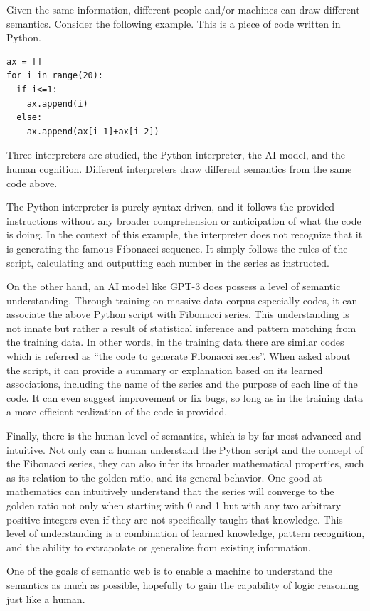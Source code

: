 Given the same information, different people and/or machines can draw different semantics. Consider the following example. This is a piece of code written in Python.
\begin{lstlisting}
ax = []
for i in range(20):
  if i<=1:
    ax.append(i)
  else:
    ax.append(ax[i-1]+ax[i-2])
\end{lstlisting}
Three interpreters are studied, the Python interpreter, the AI model, and the human cognition. Different interpreters draw different semantics from the same code above.

The Python interpreter is purely syntax-driven, and it follows the provided instructions without any broader comprehension or anticipation of what the code is doing. In the context of this example, the interpreter does not recognize that it is generating the famous Fibonacci sequence. It simply follows the rules of the script, calculating and outputting each number in the series as instructed.

On the other hand, an AI model like GPT-3 does possess a level of semantic understanding. Through training on massive data corpus especially codes, it can associate the above Python script with Fibonacci series. This understanding is not innate but rather a result of statistical inference and pattern matching from the training data. In other words, in the training data there are similar codes which is referred as ``the code to generate Fibonacci series''. When asked about the script, it can provide a summary or explanation based on its learned associations, including the name of the series and the purpose of each line of the code. It can even suggest improvement or fix bugs, so long as in the training data a more efficient realization of the code is provided.

Finally, there is the human level of semantics, which is by far most advanced and intuitive. Not only can a human understand the Python script and the concept of the Fibonacci series, they can also infer its broader mathematical properties, such as its relation to the golden ratio, and its general behavior. One good at mathematics can intuitively understand that the series will converge to the golden ratio not only when starting with 0 and 1 but with any two arbitrary positive integers even if they are not specifically taught that knowledge. This level of understanding is a combination of learned knowledge, pattern recognition, and the ability to extrapolate or generalize from existing information.

One of the goals of semantic web is to enable a machine to understand the semantics as much as possible, hopefully to gain the capability of logic reasoning just like a human. 

